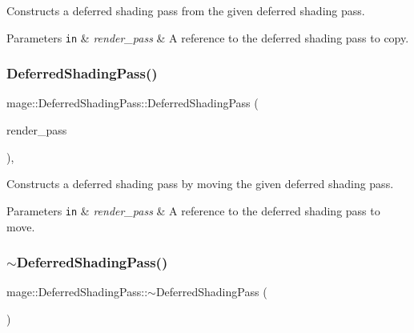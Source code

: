 Constructs a deferred shading pass from the given deferred shading pass.


\begin{DoxyParams}[1]{Parameters}
\mbox{\tt in}  & {\em render\+\_\+pass} & A reference to the deferred shading pass to copy. \\
\hline
\end{DoxyParams}
\hypertarget{classmage_1_1_deferred_shading_pass_acb75d55c9072dd92c61f04a7573e0283}{}\label{classmage_1_1_deferred_shading_pass_acb75d55c9072dd92c61f04a7573e0283} 
\subsubsection{\texorpdfstring{Deferred\+Shading\+Pass()}{DeferredShadingPass()}\hspace{0.1cm}{\footnotesize\ttfamily [3/3]}}
{\footnotesize\ttfamily mage\+::\+Deferred\+Shading\+Pass\+::\+Deferred\+Shading\+Pass (\begin{DoxyParamCaption}\item[{\hyperlink{classmage_1_1_deferred_shading_pass}{Deferred\+Shading\+Pass} \&\&}]{render\+\_\+pass }\end{DoxyParamCaption})\hspace{0.3cm}{\ttfamily [default]}, {\ttfamily [noexcept]}}

Constructs a deferred shading pass by moving the given deferred shading pass.


\begin{DoxyParams}[1]{Parameters}
\mbox{\tt in}  & {\em render\+\_\+pass} & A reference to the deferred shading pass to move. \\
\hline
\end{DoxyParams}
\hypertarget{classmage_1_1_deferred_shading_pass_a0feba3a73c56e1c07abe19fddd890f76}{}\label{classmage_1_1_deferred_shading_pass_a0feba3a73c56e1c07abe19fddd890f76} 
\subsubsection{\texorpdfstring{$\sim$\+Deferred\+Shading\+Pass()}{~DeferredShadingPass()}}
{\footnotesize\ttfamily mage\+::\+Deferred\+Shading\+Pass\+::$\sim$\+Deferred\+Shading\+Pass (\begin{DoxyParamCaption}{ }\end{DoxyParamCaption})\hspace{0.3cm}{\ttfamily [default]}}

